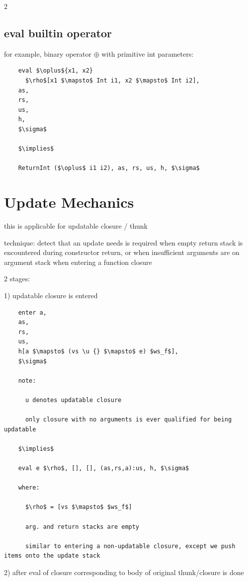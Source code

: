 \documentclass[8pt]{extarticle}
\begin{document}
\begin{multicols*}{2}
  \vfill\null
  \columnbreak

  \subsection{eval builtin operator}
  for example, binary operator $\oplus$ with primitive int parameters:

  \begin{lstlisting}
    eval $\oplus${x1, x2}
      $\rho$[x1 $\mapsto$ Int i1, x2 $\mapsto$ Int i2],
    as,
    rs,
    us,
    h,
    $\sigma$

    $\implies$

    ReturnInt ($\oplus$ i1 i2), as, rs, us, h, $\sigma$
  \end{lstlisting}

  \vfill\null
  \columnbreak

  \section{Update Mechanics}

  this is applicable for updatable closure / thunk

  technique: detect that an update needs is required when empty return stack is encountered during constructor return, or when insufficient arguments are on argument stack when entering a function closure

  2 stages:

  1) updatable closure is entered

  \begin{lstlisting}
    enter a,
    as,
    rs,
    us,
    h[a $\mapsto$ (vs \u {} $\mapsto$ e) $ws_f$],
    $\sigma$

    note:

      u denotes updatable closure

      only closure with no arguments is ever qualified for being updatable

    $\implies$

    eval e $\rho$, [], [], (as,rs,a):us, h, $\sigma$

    where:

      $\rho$ = [vs $\mapsto$ $ws_f$]

      arg. and return stacks are empty

      similar to entering a non-updatable closure, except we push items onto the update stack
  \end{lstlisting}

  2) after eval of closure corresponding to body of original thunk/closure is done


\end{multicols*}
\end{document}
